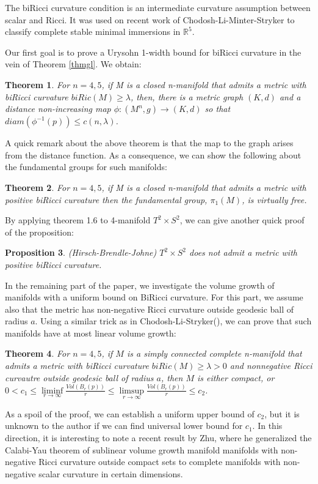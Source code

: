 \documentclass{amsart}
\newtheorem{theorem}{Theorem}[section]
\newtheorem{proposition}[theorem]{Proposition}
\theoremstyle{definition}
\theoremstyle{remark}
\numberwithin{equation}{section}
\begin{document}
The biRicci curvature condition is an intermediate curvature assumption between scalar and Ricci. It was used on recent work of Chodosh-Li-Minter-Stryker \cite{ccpd24} to classify complete stable minimal immersions in $\mathbb{R}^5$.

Our first goal is to prove a Urysohn 1-width bound for biRicci curvature in the vein of Theorem \ref{thmgl}. We obtain:

\begin{theorem}
    For $n=4,5$, if M is a closed n-manifold that admits a metric with biRicci curvature $biRic(M)\geq \lambda$, then, there is a metric graph $(K,d)$ and a distance non-increasing map $\phi :(M^{n},g)\rightarrow (K,d)$ so that $diam(\phi^{-1}(p))\leq c(n,\lambda)$.
\end{theorem}  
A quick remark about the above theorem is that the map to the graph arises from the distance function. As a consequence, we can show the following about the fundamental groups for such manifolds:
\begin{theorem}
    For $n=4,5$, if M is a closed n-manifold that admits a metric with positive biRicci curvature then the fundamental group, $\pi_{1}(M)$, is virtually free.
\end{theorem}
By applying theorem 1.6 to 4-manifold $T^{2}\times S^{2}$, we can give another quick proof of the proposition:
\begin{proposition}
    (Hirsch-Brendle-Johne\cite{ssa22})
    $T^{2}\times S^{2}$ does not admit a metric with positive biRicci curvature.
\end{proposition}
In the remaining part of the paper, we investigate the volume growth of manifolds with a uniform bound on BiRicci curvature. For this part, we assume also that the metric has non-negative Ricci curvature outside geodesic ball of radius $a$. Using a similar trick as in Chodosh-Li-Stryker(\cite{ccd24}), we can prove that such manifolds have at most linear volume growth:
 
\begin{theorem}
    For $n=4,5$, if $M$ is a simply connected complete n-manifold that admits a metric with biRicci curvature $biRic(M)\geq \lambda>0$ and nonnegative Ricci curvautre outside geodesic ball of radius $a$, then $M$ is either compact, or $0<c_{1}\leq \liminf \limits_{r\to \infty}\frac{Vol(B_{r}(p))}{r}\leq\limsup\limits_{r\to \infty}\frac{Vol(B_{r}(p))}{r}\leq c_{2}$.\\
\end{theorem}
As a spoil of the proof, we can establish a uniform upper bound of $c_{2}$, but it is unknown to the author if we can find universal lower bound for $c_{1}$. In this direction, it is interesting to note a recent result by Zhu\cite{z24}, where he generalized the Calabi-Yau theorem of sublinear volume growth manifold manifolds with non-negative Ricci curvature outside compact sets to complete manifolds with non-negative scalar curvature in certain dimensions.
\end{document}
